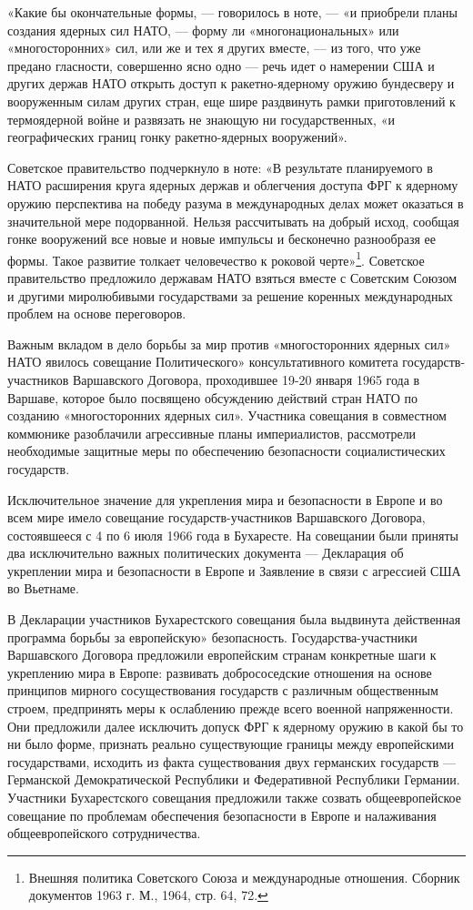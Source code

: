 \documentclass[12pt, a4paper, openany]{book}
\begin{document}
	«Какие бы окончательные формы, — говорилось в ноте, — «и приобрели планы создания ядерных сил НАТО, — форму ли «многонациональных» или «многосторонних» сил, или же и тех я других вместе, — из того, что уже предано гласности, совершенно ясно одно — речь идет о намерении США и других держав НАТО открыть доступ к ракетно-ядерному оружию бундесверу и вооруженным силам других стран, еще шире раздвинуть рамки приготовлений к термоядерной войне и развязать не знающую ни государственных, «и географических границ гонку ракетно-ядерных вооружений».
	
	Советское правительство подчеркнуло в ноте: «В результате планируемого в НАТО расширения круга ядерных держав и облегчения доступа ФРГ к ядерному оружию перспектива на победу разума в международных делах может оказаться в значительной мере подорванной. Нельзя рассчитывать на добрый исход, сообщая гонке вооружений все новые и новые импульсы и бесконечно разнообразя ее формы. Такое развитие толкает человечество к роковой черте»{\footnote{Внешняя политика Советского Союза и международные отношения. Сборник документов 1963 г. М., 1964, стр. 64, 72.}}. Советское правительство предложило державам НАТО взяться вместе с Советским Союзом и другими миролюбивыми государствами за решение коренных международных проблем на основе переговоров.
	
	Важным вкладом в дело борьбы за мир против «многосторонних ядерных сил» НАТО явилось совещание Политического» консультативного комитета государств-участников Варшавского Договора, проходившее 19-20 января 1965 года в Варшаве, которое было посвящено обсуждению действий стран НАТО по созданию «многосторонних ядерных сил». Участника совещания в совместном коммюнике разоблачили агрессивные планы империалистов, рассмотрели необходимые защитные меры по обеспечению безопасности социалистических государств.
	
	Исключительное значение для укрепления мира и безопасности в Европе и во всем мире имело совещание государств-участников Варшавского Договора, состоявшееся с 4 по 6 июля 1966 года в Бухаресте. На совещании были приняты два исключительно важных политических документа — Декларация об укреплении мира и безопасности в Европе и Заявление в связи с агрессией США во Вьетнаме.
	
	В Декларации участников Бухарестского совещания была выдвинута действенная программа борьбы за европейскую» безопасность. Государства-участники Варшавского Договора предложили европейским странам конкретные шаги к укреплению мира в Европе: развивать добрососедские отношения на основе принципов мирного сосуществования государств с различным общественным строем, предпринять меры к ослаблению прежде всего военной напряженности. Они предложили далее исключить допуск ФРГ к ядерному оружию в какой бы то ни было форме, признать реально существующие границы между европейскими государствами, исходить из факта существования двух германских государств — Германской Демократической Республики и Федеративной Республики Германии. Участники Бухарестского совещания предложили также созвать общеевропейское совещание по проблемам обеспечения безопасности в Европе и налаживания общеевропейского сотрудничества.
	
\end{document}
